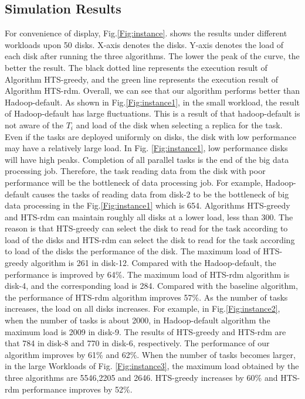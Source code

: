 \documentclass[conference]{IEEEtran}
\begin{document}
\subsection{Simulation Results}

For convenience of display, Fig.\ref{Fig:instance}. shows the results under different workloads upon 50 disks. X-axis denotes the disks. Y-axis denotes the load of each disk after running the three algorithms. The lower the peak of the curve, the better the result. The black dotted line represents the execution result of Algorithm HTS-greedy, and the green line represents the execution result of Algorithm HTS-rdm. Overall, we can see that our algorithm performs better than Hadoop-default. As shown in Fig.\ref{Fig:instance1}, in the small workload, the result of Hadoop-default has large fluctuations. This is a result of that hadoop-default is not aware of the $T_i$ and load of the disk when selecting a replica for the task. Even if the tasks are deployed uniformly on disks, the disk with low performance may have a relatively large load. In Fig. \ref{Fig:instance1}, low performance disks will have high peaks. Completion of all parallel tasks is the end of the big data processing job. Therefore, the task reading data from the disk with poor performance will be the bottleneck of data processing job. For example, Hadoop-default causes the tasks of reading data from disk-2 to be the bottleneck of big data processing in the Fig.\ref{Fig:instance1} which is 654. Algorithms HTS-greedy and HTS-rdm can maintain roughly all disks at a lower load, less than 300. The reason is that HTS-greedy can select the disk to read for the task according to load of the disks and HTS-rdm can select the disk to read for the task according to load of the disks the performance of the disk. The maximum load of HTS-greedy algorithm is 261 in disk-12. Compared with the Hadoop-default, the performance is improved by 64\%. The maximum load of HTS-rdm algorithm is disk-4, and the corresponding load is 284. Compared with the baseline algorithm, the performance of HTS-rdm algorithm improves 57\%.
As the number of tasks increases, the load on all disks increases. For example, in Fig.\ref{Fig:instance2}, when the number of tasks is about 2000, in Hadoop-default algorithm the maximum load is 2009 in disk-9. The results of HTS-greedy and HTS-rdm are that 784 in disk-8  and 770 in disk-6, respectively. The performance of our algorithm improves by 61\% and 62\%. 
When the number of tasks becomes larger, in the large Workloads of Fig. \ref{Fig:instance3}, the maximum load obtained by the three algorithms are 5546,2205 and 2646. HTS-greedy increases by 60\% and HTS-rdm performance improves by 52\%.
 
\end{document}
